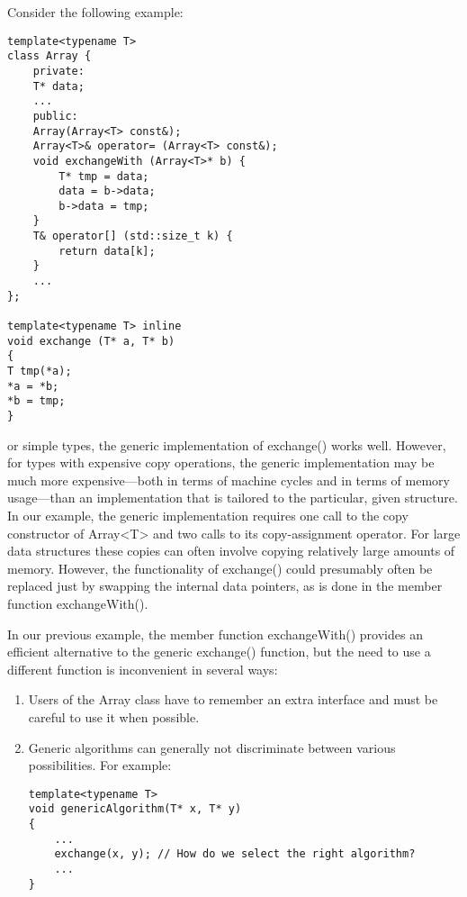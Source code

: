 
Consider the following example:

\begin{lstlisting}[style=styleCXX]
template<typename T>
class Array {
	private:
	T* data;
	...
	public:
	Array(Array<T> const&);
	Array<T>& operator= (Array<T> const&);
	void exchangeWith (Array<T>* b) {
		T* tmp = data;
		data = b->data;
		b->data = tmp;
	}
	T& operator[] (std::size_t k) {
		return data[k];
	}
	...
};

template<typename T> inline
void exchange (T* a, T* b)
{
T tmp(*a);
*a = *b;
*b = tmp;
}
\end{lstlisting}

or simple types, the generic implementation of exchange() works well. However, for types with expensive copy operations, the generic implementation may be much more expensive—both in terms of machine cycles and in terms of memory usage—than an implementation that is tailored to the particular, given structure. In our example, the generic implementation requires one call to the copy constructor of Array<T> and two calls to its copy-assignment operator. For large data structures these copies can often involve copying relatively large amounts of memory. However, the functionality of exchange() could presumably often be replaced just by swapping the internal data pointers, as is done in the member function exchangeWith().



In our previous example, the member function exchangeWith() provides an efficient alternative to the generic exchange() function, but the need to use a different function is inconvenient in several ways:

\begin{enumerate}
\item 
Users of the Array class have to remember an extra interface and must be careful to use it when possible.

\item 
Generic algorithms can generally not discriminate between various possibilities. For example:

\begin{lstlisting}[style=styleCXX]
template<typename T>
void genericAlgorithm(T* x, T* y)
{
	...
	exchange(x, y); // How do we select the right algorithm?
	...
}
\end{lstlisting}

\end{enumerate}

